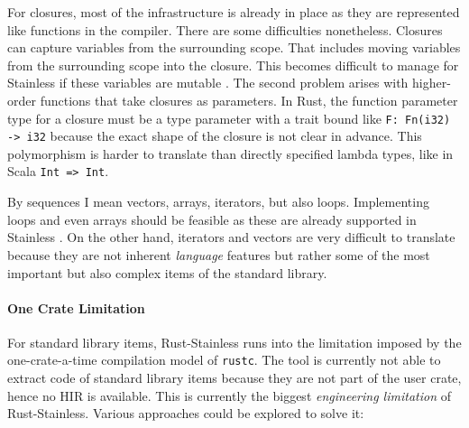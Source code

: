 For closures, most of the infrastructure is already in place as they are
represented like functions in the compiler. There are some difficulties
nonetheless. Closures can capture variables from the surrounding scope. That
includes moving variables from the surrounding scope into the closure. This
becomes difficult to manage for Stainless if these variables are mutable
\cite[section 3.4.3]{regb}. The second problem arises with higher-order
functions that take closures as parameters. In Rust, the function parameter type
for a closure must be a type parameter with a trait bound like
\passthrough{\lstinline!F: Fn(i32) -> i32!} because the exact shape of the
closure is not clear in advance. This polymorphism is harder to translate than
directly specified lambda types, like in Scala \passthrough{\lstinline!Int =>
Int!}.

By sequences I mean vectors, arrays, iterators, but also loops. Implementing
loops and even arrays should be feasible as these are already supported in
Stainless \cite[section ``Imperative'']{stainless-doc}. On the other hand,
iterators and vectors are very difficult to translate because they are not
inherent \emph{language} features but rather some of the most important but also
complex items of the standard library.


\paragraph{One Crate Limitation}

For standard library items, Rust-Stainless runs into the limitation imposed by
the one-crate-a-time compilation model of \lstinline!rustc!. The tool is
currently not able to extract code of standard library items because they are
not part of the user crate, hence no HIR is available. This is currently the
biggest \emph{engineering limitation} of Rust-Stainless. Various approaches
could be explored to solve it:

